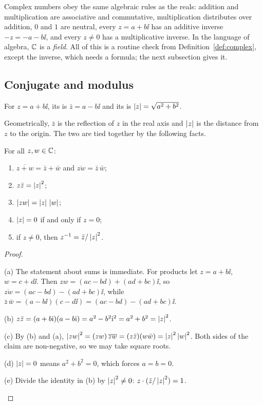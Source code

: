 Complex numbers obey the same algebraic rules as the reals: addition and multiplication are associative and commutative, multiplication distributes over addition, $0$ and $1$ are neutral, every $z=a+b\ii$ has an additive inverse $-z=-a-b\ii$, and every $z\neq0$ has a multiplicative inverse. In the language of algebra, $\mathbb{C}$ is a \emph{field}. All of this is a routine check from Definition~\ref{def:complex}, except the inverse, which needs a formula; the next subsection gives it.

\subsection{Conjugate and modulus}

\begin{definition}\label{def:conj}
  For $z=a+b\ii$, its  is $\bar z=a-b\ii$ and its  is $\left|z\right|=\sqrt{a^2+b^2}$.
\end{definition}

Geometrically, $\bar z$ is the reflection of $z$ in the real axis and $\left|z\right|$ is the distance from $z$ to the origin. The two are tied together by the following facts.

\begin{theorem}\label{thm:basic}
  For all $z,w\in\mathbb{C}$:
  \begin{enumerate}
    \item[(a)] $\overline{z+w}=\bar z+\bar w$ and $\overline{zw}=\bar z\,\bar w$;
    \item[(b)] $z\bar z=\left|z\right|^2$;
    \item[(c)] $\left|zw\right|=\left|z\right|\,\left|w\right|$;
    \item[(d)] $\left|z\right|=0$ if and only if $z=0$;
    \item[(e)] if $z\ne0$, then $z^{-1}=\bar z/\left|z\right|^2$.
  \end{enumerate}
\end{theorem}
\begin{proof}
  \begin{steps}
    \item (a) The statement about sums is immediate. For products let $z=a+b\ii$, $w=c+d\ii$. Then $zw=(ac-bd)+(ad+bc)\ii$, so $\overline{zw}=(ac-bd)-(ad+bc)\ii$, while $\bar z\,\bar w=(a-b\ii)(c-d\ii)=(ac-bd)-(ad+bc)\ii$.
    \item (b) $z\bar z=(a+b\mathrm{i})(a-b\mathrm{i})=a^2-b^2\mathrm{i}^2=a^2+b^2=\left|z\right|^2$.
    \item (c) By (b) and (a), $\left|zw\right|^2=(zw)\,\overline{zw}=(z\bar z)(w\bar w)=\left|z\right|^2\left|w\right|^2$. Both sides of the claim are non-negative, so we may take square roots.
    \item (d) $\left|z\right|=0$ means $a^2+b^2=0$, which forces $a=b=0$.
    \item (e) Divide the identity in (b) by $\left|z\right|^2\neq0$: $z\cdot(\bar z/\left|z\right|^2)=1$. \qedhere
  \end{steps}
\end{proof}


